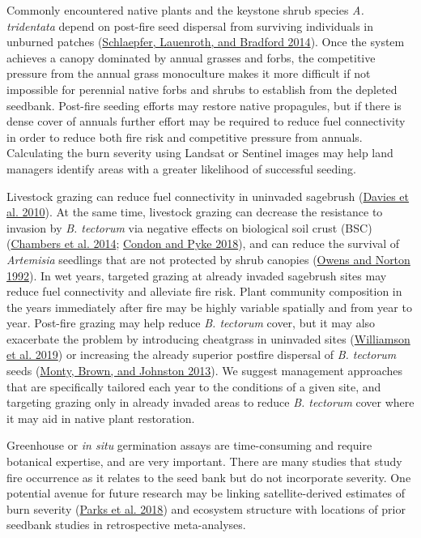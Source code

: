 \documentclass[
  12pt,
]{article}
\begin{document}
Commonly encountered native plants and the keystone shrub species
\emph{A. tridentata} depend on post-fire seed dispersal from surviving
individuals in unburned patches
(\protect\hyperlink{ref-Schlaepfer2014}{Schlaepfer, Lauenroth, and
Bradford 2014}). Once the system achieves a canopy dominated by annual
grasses and forbs, the competitive pressure from the annual grass
monoculture makes it more difficult if not impossible for perennial
native forbs and shrubs to establish from the depleted seedbank.
Post-fire seeding efforts may restore native propagules, but if there is
dense cover of annuals further effort may be required to reduce fuel
connectivity in order to reduce both fire risk and competitive pressure
from annuals. Calculating the burn severity using Landsat or Sentinel
images may help land managers identify areas with a greater likelihood
of successful seeding.

Livestock grazing can reduce fuel connectivity in uninvaded sagebrush
(\protect\hyperlink{ref-Davies2010}{Davies et al. 2010}). At the same
time, livestock grazing can decrease the resistance to invasion by
\emph{B. tectorum} via negative effects on biological soil crust (BSC)
(\protect\hyperlink{ref-chambers_resilience_2014}{Chambers et al. 2014};
\protect\hyperlink{ref-Condon2018}{Condon and Pyke 2018}), and can
reduce the survival of \emph{Artemisia} seedlings that are not protected
by shrub canopies (\protect\hyperlink{ref-Owens1992}{Owens and Norton
1992}). In wet years, targeted grazing at already invaded sagebrush
sites may reduce fuel connectivity and alleviate fire risk. Plant
community composition in the years immediately after fire may be highly
variable spatially and from year to year. Post-fire grazing may help
reduce \emph{B. tectorum} cover, but it may also exacerbate the problem
by introducing cheatgrass in uninvaded sites
(\protect\hyperlink{ref-Williamson2019}{Williamson et al. 2019}) or
increasing the already superior postfire dispersal of \emph{B. tectorum}
seeds (\protect\hyperlink{ref-Monty2013}{Monty, Brown, and Johnston
2013}). We suggest management approaches that are specifically tailored
each year to the conditions of a given site, and targeting grazing only
in already invaded areas to reduce \emph{B. tectorum} cover where it may
aid in native plant restoration.

Greenhouse or \emph{in situ} germination assays are time-consuming and
require botanical expertise, and are very important. There are many
studies that study fire occurrence as it relates to the seed bank but do
not incorporate severity. One potential avenue for future research may
be linking satellite-derived estimates of burn severity
(\protect\hyperlink{ref-Parks2018}{Parks et al. 2018}) and ecosystem
structure with locations of prior seedbank studies in retrospective
meta-analyses.
\end{document}
